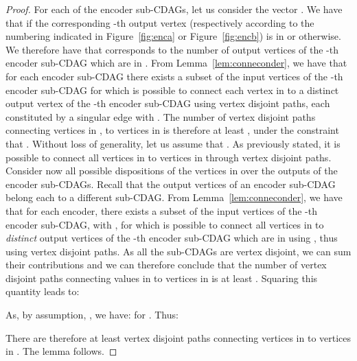 \documentclass[a4paper,UKenglish]{lipics-v2016}
\begin{document}
\begin{proof}
	For each of the  encoder sub-CDAGs, let us consider the vector . We have that  if the corresponding -th output vertex (respectively according to the numbering indicated in Figure~\ref{fig:enca} or Figure~\ref{fig:encb}) is in  or  otherwise. We therefore have that  corresponds to the number of output vertices of the -th encoder sub-CDAG which are in .
	 From Lemma~\ref{lem:conneconder}, we have that for each encoder sub-CDAG there exists a subset  of the input vertices of the -th encoder sub-CDAG for which is possible to connect each vertex in  to a distinct output vertex of the -th encoder sub-CDAG using vertex disjoint paths, each constituted by a singular edge with . The number of vertex disjoint paths connecting vertices in , to vertices in  is therefore at least , under the constraint that .
		Without loss of generality, let us assume that . As previously stated, it is possible to connect all vertices in  to vertices in  through vertex disjoint paths. Consider now all possible dispositions of the vertices in  over the outputs of the  encoder sub-CDAGs. 
		Recall that the output vertices of an encoder sub-CDAG belong each to a different  sub-CDAG. From Lemma~\ref{lem:conneconder}, we have that for each encoder, there exists a subset  of the input vertices of the -th encoder sub-CDAG, with
		, 		for which is possible to connect all vertices in  to  \emph{distinct} output vertices of the -th encoder sub-CDAG which are in  using , thus using vertex disjoint paths.
As all the  sub-CDAGs are vertex disjoint, we can sum their contributions and we can therefore conclude that the number of vertex disjoint paths connecting values in  to vertices in   is at least .
	Squaring this quantity leads to:
	
	As, by assumption, , we have:  for . Thus:
	
	
	There are therefore at least  vertex disjoint paths connecting vertices in  to vertices in . The lemma follows.
\end{proof}
\end{document}
